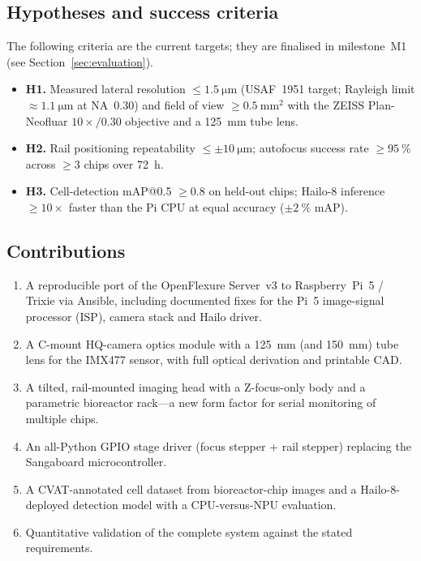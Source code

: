 \subsection{Hypotheses and success criteria}
\label{sec:hypotheses}
The following criteria are the current targets; they are finalised in
milestone~M1 (see Section~\ref{sec:evaluation}).
\begin{itemize}
\item \textbf{H1.} Measured lateral resolution $\leq \SI{1.5}{\micro\meter}$
  (USAF~1951 target; Rayleigh limit $\approx \SI{1.1}{\micro\meter}$ at
  NA~$0.30$) and field of view $\geq \SI{0.5}{\milli\meter\squared}$ with the
  ZEISS Plan-Neofluar $10\times/0.30$ objective and a \SI{125}{\milli\meter}
  tube lens.
\item \textbf{H2.} Rail positioning repeatability
  $\leq \pm\SI{10}{\micro\meter}$; autofocus success rate $\geq \SI{95}{\percent}$
  across $\geq 3$ chips over \SI{72}{\hour}.
\item \textbf{H3.} Cell-detection mAP@0.5 $\geq 0.8$ on held-out chips; Hailo-8
  inference $\geq 10\times$ faster than the Pi CPU at equal accuracy
  ($\pm\SI{2}{\percent}$ mAP).
\end{itemize}

\subsection{Contributions}
\label{sec:contributions}
\begin{enumerate}
\item A reproducible port of the OpenFlexure Server~v3 to Raspberry~Pi~5 /
  Trixie via Ansible, including documented fixes for the Pi~5 image-signal
  processor (ISP), camera stack and Hailo driver.
\item A C-mount HQ-camera optics module with a \SI{125}{\milli\meter} (and
  \SI{150}{\milli\meter}) tube lens for the IMX477 sensor, with full optical
  derivation and printable CAD.
\item A tilted, rail-mounted imaging head with a Z-focus-only body and a
  parametric bioreactor rack---a new form factor for serial monitoring of
  multiple chips.
\item An all-Python GPIO stage driver (focus stepper + rail stepper) replacing
  the Sangaboard microcontroller. 
\item A CVAT-annotated cell dataset from bioreactor-chip images and a
  Hailo-8-deployed detection model with a CPU-versus-NPU evaluation.
\item Quantitative validation of the complete system against the stated
  requirements.
\end{enumerate}

